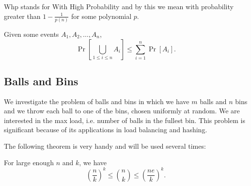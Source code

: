 

\begin{definition}[whp] Whp stands for With High Probability and by this we mean with probability greater than $1 - \frac{1}{p(n)}$ for some polynomial $p$.
\end{definition}

\begin{theorem}
Given some events $A_1, A_2, \ldots, A_n$, 
$$\Pr\left[\bigcup_{1 \leq i \leq n} A_i\right] \leq \sum_{i=1}^{n} \Pr[A_i].$$
\end{theorem}

\subsection{Balls and Bins}

We investigate the problem of balls and bins in which we have $m$ balls and $n$ bins and we throw each ball to one of the bins, chosen uniformly at random. We are interested in the max load, i.e. number of balls in the fullest bin. This problem is significant because of its applications in load balancing and hashing.

The following theorem is very handy and will be used several times:
\begin{theorem}
For large enough $n$ and $k$, we have
$$\left( \frac{n}{k} \right)^k \leq \binom{n}{k} \leq \left( \frac{n e}{k} \right)^k.$$

\end{theorem}

